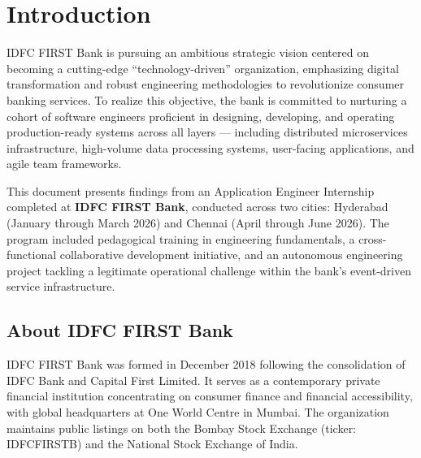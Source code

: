\chapter{Introduction}

IDFC FIRST Bank is pursuing an ambitious strategic vision centered on becoming a 
cutting-edge ``technology-driven'' organization, emphasizing digital transformation 
and robust engineering methodologies to revolutionize consumer banking services. 
To realize this objective, the bank is committed to nurturing a cohort of software 
engineers proficient in designing, developing, and operating production-ready systems 
across all layers --- including distributed microservices infrastructure, high-volume 
data processing systems, user-facing applications, and agile team frameworks.

This document presents findings from an Application Engineer Internship completed at 
\textbf{IDFC FIRST Bank}, conducted across two cities: Hyderabad (January through March 
2026) and Chennai (April through June 2026). The program included pedagogical training 
in engineering fundamentals, a cross-functional collaborative development initiative, 
and an autonomous engineering project tackling a legitimate operational challenge 
within the bank's event-driven service infrastructure.

\section{About IDFC FIRST Bank}

IDFC FIRST Bank was formed in December 2018 following the consolidation of IDFC Bank 
and Capital First Limited. It serves as a contemporary private financial institution 
concentrating on consumer finance and financial accessibility, with global headquarters 
at One World Centre in Mumbai. The organization maintains public listings on both the 
Bombay Stock Exchange (ticker: IDFCFIRSTB) and the National Stock Exchange of India.

